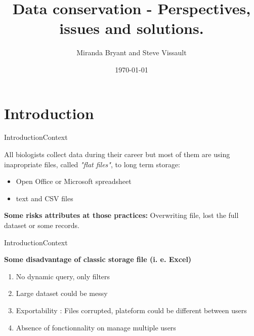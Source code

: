 \documentclass[table]{eecslides}
\title[]{Data conservation - Perspectives, issues and solutions.}
\author[]{\color{white}  Miranda Bryant and Steve Vissault}
\institute[\color{white} UQAR]{\color{white} \textbf{Les midis numériques}}
\date{ \color{white} \today}
\begin{document}
\begin{frame}[plain]
\titlepage
\end{frame}


\section{Introduction}

\begin{frame}{Introduction}{Context}

All biologists collect data during their career but most of them are using \alert{inapropriate files}, called \textit{"flat files"}, to long term storage:

\begin{itemize}
	\item  Open Office or Microsoft spreadsheet
	\item  text and CSV files
\end{itemize}

\textbf{Some risks attributes at those practices:} Overwriting file, lost the full dataset or some records.

\end{frame}


\begin{frame}{Introduction}{Context}

\textbf{\alert{Some disadvantage of classic storage file (i. e. Excel)}}

\begin{enumerate}
	\item No dynamic query, only filters
	\item Large dataset could be messy
	\item Exportability : Files corrupted, plateform could be different between users
	\item Absence of fonctionnality on manage multiple users
\end{enumerate}



\end{frame}

\end{document}
